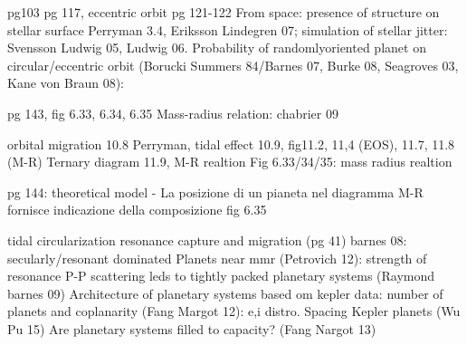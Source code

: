 \begin{workout}
pg103
pg 117, eccentric orbit pg 121-122
From space: presence of structure on stellar surface Perryman 3.4, Eriksson Lindegren 07; simulation of stellar jitter: Svensson Ludwig 05, Ludwig 06.
Probability of randomlyoriented planet on circular/eccentric orbit (Borucki Summers 84/Barnes 07, Burke 08,  Seagroves 03, Kane von Braun 08):
\end{workout}

\begin{workout}
pg 143, fig 6.33, 6.34, 6.35
Mass-radius relation: chabrier 09
\end{workout}

\begin{workout}[M-R diagram]
orbital migration 10.8 Perryman, tidal effect 10.9, 
fig11.2, 11,4 (EOS), 11.7, 11.8 (M-R)
Ternary diagram 11.9, M-R realtion
Fig 6.33/34/35: mass radius realtion

pg 144: theoretical model - La posizione di un pianeta nel diagramma M-R fornisce indicazione della composizione
fig 6.35
\end{workout}

\begin{workout}
\end{workout}

\begin{workout}
tidal circularization
resonance capture and migration (pg 41)
barnes 08: secularly/resonant dominated
Planets near mmr (Petrovich 12): strength of resonance
P-P scattering leds to tightly packed planetary systems (Raymond barnes 09)
Architecture of planetary systems based om kepler data: number of planets and coplanarity (Fang Margot 12): e,i distro.
Spacing Kepler planets (Wu Pu 15)
Are planetary systems filled to capacity? (Fang Nargot 13)
\end{workout}
